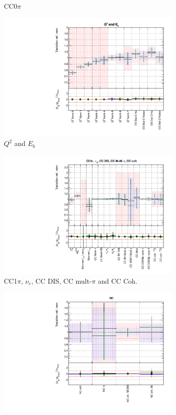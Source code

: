 \begin{figure}
\begin{subfigure}{0.49\textwidth}
  \caption{CC0$\pi$}
\end{subfigure}
\begin{subfigure}{0.49\textwidth}
  \centering
  \includegraphics[width=0.9\linewidth]{figs/polyasmvsxsec_2}
  \caption{$Q^2$ and $E_b$}
\end{subfigure}
\begin{subfigure}{0.49\textwidth}
  \centering
  \includegraphics[width=0.9\linewidth]{figs/polyasmvsxsec_3}
  \caption{CC1$\pi$, $\nu_e$, CC DIS, CC mult-$\pi$ and CC Coh.}
\end{subfigure}
\begin{subfigure}{0.49\textwidth}
  \centering
  \includegraphics[width=0.9\linewidth]{figs/polyasmvsxsec_4}

\end{subfigure}
\end{figure}
